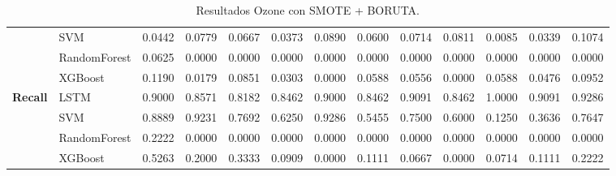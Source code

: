 \begin{table}[h]
\begin{adjustbox}{max width=15cm}
\begin{tabular}{|c|l|r|r|r|r|r|r|r|r|r|r|r|}
			& SVM &  0.0442 &  0.0779 &  0.0667 &  0.0373 &  0.0890 &  0.0600 &  0.0714 &  0.0811 &  0.0085 &  0.0339 &  0.1074 \\
			& RandomForest &  0.0625 &  0.0000 &  0.0000 &  0.0000 &  0.0000 &  0.0000 &  0.0000 &  0.0000 &  0.0000 &  0.0000 &  0.0000 \\
			& XGBoost &  0.1190 &  0.0179 &  0.0851 &  0.0303 &  0.0000 &  0.0588 &  0.0556 &  0.0000 &  0.0588 &  0.0476 &  0.0952 \\
			\hline
			\textbf{Recall} & LSTM &  0.9000 &  0.8571 &  0.8182 &  0.8462 &  0.9000 &  0.8462 &  0.9091 &  0.8462 &  1.0000 &  0.9091 &  0.9286 \\
			& SVM &  0.8889 &  0.9231 &  0.7692 &  0.6250 &  0.9286 &  0.5455 &  0.7500 &  0.6000 &  0.1250 &  0.3636 &  0.7647 \\
			& RandomForest &  0.2222 &  0.0000 &  0.0000 &  0.0000 &  0.0000 &  0.0000 &  0.0000 &  0.0000 &  0.0000 &  0.0000 &  0.0000 \\
			& XGBoost &  0.5263 &  0.2000 &  0.3333 &  0.0909 &  0.0000 &  0.1111 &  0.0667 &  0.0000 &  0.0714 &  0.1111 &  0.2222 \\
			\hline
		\end{tabular}
	\end{adjustbox}
	\caption{Resultados Ozone con SMOTE + BORUTA.}
	\label{tab:Ozone_SMOTE_BORUTA}
\end{table}


